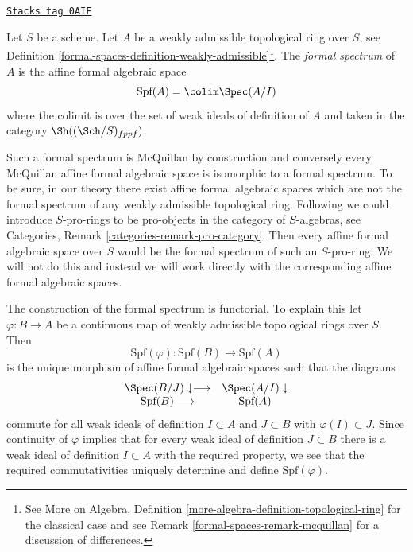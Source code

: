 \begin{definition}
\label{formal-spaces-definition-affine-formal-spectrum}
\href{https://stacks.math.columbia.edu/tag/0AIF}{\texttt{Stacks tag 0AIF}}

Let $S$ be a scheme. Let $A$ be a weakly admissible topological ring over
$S$, see Definition \ref{formal-spaces-definition-weakly-admissible}\footnote{See
More on Algebra, Definition
\ref{more-algebra-definition-topological-ring}
for the classical case and see Remark \ref{formal-spaces-remark-mcquillan}
for a discussion of differences.}.
The {\it formal spectrum} of $A$ is the affine formal algebraic space
$$
\text{Spf}(A) = \colim \Spec(A/I)
$$
where the colimit is over the set of weak ideals of definition of $A$
and taken in the category $\Sh((\Sch/S)_{fppf})$.
\end{definition}

Such a formal spectrum is McQuillan by construction and conversely
every McQuillan affine formal algebraic space is isomorphic to a
formal spectrum. To be sure, in our theory there exist affine formal
algebraic spaces which are not the formal spectrum of any
weakly admissible topological ring.
Following \cite{Yasuda} we could introduce $S$-pro-rings
to be pro-objects in the category of $S$-algebras, see Categories,
Remark \ref{categories-remark-pro-category}. Then every
affine formal algebraic space over $S$ would be the formal spectrum of such
an $S$-pro-ring. We will not do this and instead we will work directly with the
corresponding affine formal algebraic spaces.

\medskip\noindent
The construction of the formal spectrum is functorial. To explain this
let $\varphi : B \to A$ be a continuous map of weakly admissible
topological rings over $S$. Then
$$
\text{Spf}(\varphi) : \text{Spf}(B) \to \text{Spf}(A)
$$
is the unique morphism of affine formal algebraic spaces such that
the diagrams
$$
\begin{array}{cc}\Spec(B/J) \downarrow\longrightarrow & \Spec(A/I) \downarrow \\ \text{Spf}(B) \longrightarrow & \text{Spf}(A)\end{array}
$$
commute for all weak ideals of definition $I \subset A$ and $J \subset B$
with $\varphi(I) \subset J$. Since continuity of $\varphi$
implies that for every weak ideal of definition $J \subset B$
there is a weak ideal of definition $I \subset A$ with the required
property, we see that the required commutativities uniquely
determine and define $\text{Spf}(\varphi)$.

